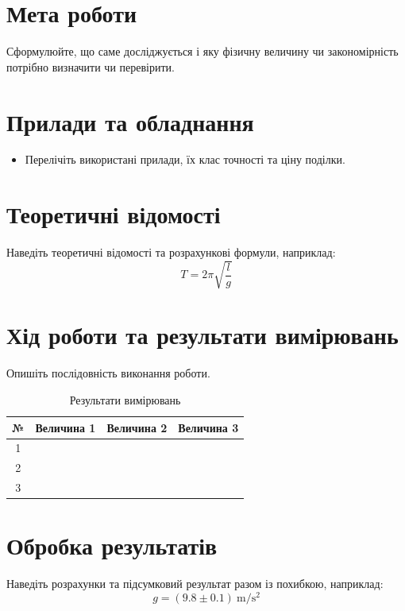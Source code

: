 \documentclass[ukrainian]{ucaphyslab}
\begin{document}
\maketitlepage

\section{Мета роботи}
Сформулюйте, що саме досліджується і яку фізичну величину чи закономірність
потрібно визначити чи перевірити.

\section{Прилади та обладнання}
\begin{itemize}
  \item Перелічіть використані прилади, їх клас точності та ціну поділки.
\end{itemize}

\section{Теоретичні відомості}
Наведіть теоретичні відомості та розрахункові формули, наприклад:
\begin{equation}
  T = 2\pi\sqrt{\frac{l}{g}}
\end{equation}

\section{Хід роботи та результати вимірювань}
Опишіть послідовність виконання роботи.

\begin{table}[h]
  \centering
  \begin{tabular}{@{}cccc@{}}
    \toprule
    № & Величина 1 & Величина 2 & Величина 3 \\
    \midrule
    1 & & & \\
    2 & & & \\
    3 & & & \\
    \bottomrule
  \end{tabular}
  \caption{Результати вимірювань}
\end{table}

\section{Обробка результатів}
Наведіть розрахунки та підсумковий результат разом із похибкою, наприклад:
\begin{equation}
  g = (\num{9.8} \pm \num{0.1})\ \si{\meter\per\second\squared}
\end{equation}
\end{document}
